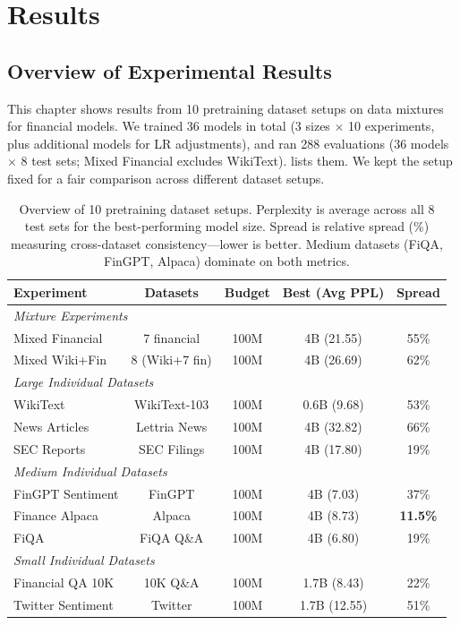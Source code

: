 \chapter{Results}

\section{Overview of Experimental Results}

This chapter shows results from 10 pretraining dataset setups on data mixtures for financial models. We trained 36 models in total (3 sizes $\times$ 10 experiments, plus additional models for LR adjustments), and ran 288 evaluations (36 models $\times$ 8 test sets; Mixed Financial excludes WikiText).  lists them. We kept the setup fixed for a fair comparison across different dataset setups.

\begin{table}[h]
\centering
\small
\begin{tabular}{lcccc}
\toprule
\textbf{Experiment} & \textbf{Datasets} & \textbf{Budget} & \textbf{Best (Avg PPL)} & \textbf{Spread} \\
\midrule
\multicolumn{5}{l}{\textit{Mixture Experiments}} \\
Mixed Financial & 7 financial & 100M & 4B (21.55) & 55\% \\
Mixed Wiki+Fin & 8 (Wiki+7 fin) & 100M & 4B (26.69) & 62\% \\
\midrule
\multicolumn{5}{l}{\textit{Large Individual Datasets}} \\
WikiText & WikiText-103 & 100M & 0.6B (9.68) & 53\% \\
News Articles & Lettria News & 100M & 4B (32.82) & 66\% \\
SEC Reports & SEC Filings & 100M & 4B (17.80) & 19\% \\
\midrule
\multicolumn{5}{l}{\textit{Medium Individual Datasets}} \\
FinGPT Sentiment & FinGPT & 100M & 4B (7.03) & 37\% \\
Finance Alpaca & Alpaca & 100M & 4B (8.73) & \textbf{11.5\%} \\
FiQA & FiQA Q\&A & 100M & 4B (6.80) & 19\% \\
\midrule
\multicolumn{5}{l}{\textit{Small Individual Datasets}} \\
Financial QA 10K & 10K Q\&A & 100M & 1.7B (8.43) & 22\% \\
Twitter Sentiment & Twitter & 100M & 1.7B (12.55) & 51\% \\
\bottomrule
\end{tabular}
\caption[Overview of Pretraining Experiments]{Overview of 10 pretraining dataset setups. Perplexity is average across all 8 test sets for the best-performing model size. Spread is relative spread (\%) measuring cross-dataset consistency—lower is better. Medium datasets (FiQA, FinGPT, Alpaca) dominate on both metrics.}
\label{tab:experiments_overview}
\end{table}

